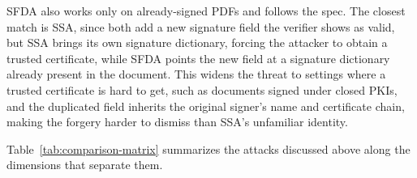 \documentclass[12pt]{article}
\begin{document}
SFDA also works only on already-signed PDFs and follows the spec. The closest match is SSA, since both add a new signature field the verifier shows as valid, but SSA brings its own signature dictionary, forcing the attacker to obtain a trusted certificate, while SFDA points the new field at a signature dictionary already present in the document. This widens the threat to settings where a trusted certificate is hard to get, such as documents signed under closed PKIs, and the duplicated field inherits the original signer's name and certificate chain, making the forgery harder to dismiss than SSA's unfamiliar identity.

Table~\ref{tab:comparison-matrix} summarizes the attacks discussed above along the dimensions that separate them.

\begin{table}[htb]
	\centering
	\footnotesize
	\caption{Comparison of PDF signature-forgery attacks.}
	\label{tab:comparison-matrix}
\end{table}
\end{document}
